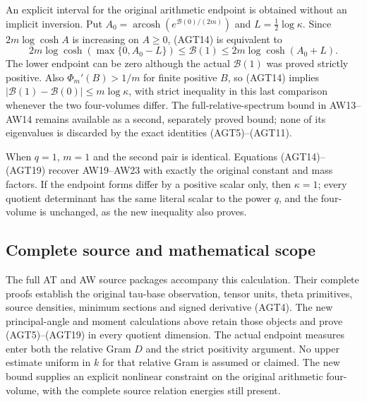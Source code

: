 An explicit interval for the original arithmetic endpoint is
obtained without an implicit inversion. Put
$A_0=\operatorname{arcosh}(e^{\mathcal B(0)/(2m)})$
and $L=\tfrac12\log\kappa$. Since $2m\log\cosh A$ is
increasing on $A\ge0$, (AGT14) is equivalent to
\[
 2m\log\cosh(\max\{0,A_0-L\})
 \le\mathcal B(1)\le2m\log\cosh(A_0+L).
 \tag{AGT19}
\]
The lower endpoint can be zero although the actual
$\mathcal B(1)$ was proved strictly positive.
Also $\Phi_m'(B)>1/m$ for finite positive $B$, so (AGT14)
implies $|\mathcal B(1)-\mathcal B(0)|\le m\log\kappa$,
with strict inequality in this last comparison whenever
the two four-volumes differ. The full-relative-spectrum
bound in AW13--AW14 remains available as a second, separately
proved bound; none of its eigenvalues is discarded by
the exact identities (AGT5)--(AGT11).

When $q=1$, $m=1$ and the second pair is identical.
Equations (AGT14)--(AGT19) recover AW19--AW23 with exactly
the original constant and mass factors. If the endpoint
forms differ by a positive scalar only, then $\kappa=1$;
every quotient determinant has the same literal scalar to
the power $q$, and the four-volume is unchanged, as the
new inequality also proves.

\subsection{Complete source and mathematical scope}

The full AT and AW source packages accompany this calculation.
Their complete proofs establish the original tau-base
observation, tensor units, theta primitives, source densities,
minimum sections and signed derivative (AGT4).
The new principal-angle and moment calculations above retain
those objects and prove (AGT5)--(AGT19) in every quotient
dimension. The actual endpoint measures enter both the
relative Gram $D$ and the strict positivity argument.
No upper estimate uniform in $k$ for that relative Gram
is assumed or claimed. The new bound supplies an explicit
nonlinear constraint on the original arithmetic four-volume,
with the complete source relation energies still present.

\endgroup
